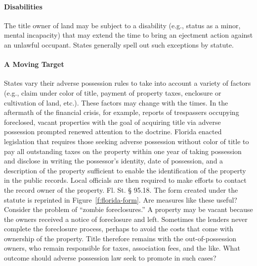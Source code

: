 \paragraph{Disabilities} The title owner of land may be subject to a
disability (e.g., status as a minor, mental incapacity) that may extend the
time to bring an ejectment action against an unlawful occupant. States
generally spell out such exceptions by statute.


\paragraph{A Moving Target} States vary their adverse possession rules to
take into account a variety of factors (e.g., claim under color of title,
payment of property taxes, enclosure or cultivation of land, etc.). These
factors may change with the times. In the aftermath of the financial crisis,
for example, reports of trespassers occupying foreclosed, vacant properties
with the goal of acquiring title via adverse possession prompted renewed
attention to the doctrine. Florida enacted legislation that requires those
seeking adverse possession without color of title to pay all outstanding taxes
on the property within one year of taking possession and disclose in writing
the possessor's identity, date of possession, and a description of the property
sufficient to enable the identification of the property in the public records.
Local officials are then required to make efforts to contact the record owner
of the property. Fl. St. {\S} 95.18. The form created under the statute is
reprinted in Figure~\ref{f:florida-form}.
Are measures like these useful? Consider the problem of
``zombie foreclosures.'' A property may be vacant because the owners received a
notice of foreclosure and left. Sometimes the lenders never complete the
foreclosure process, perhaps to avoid the costs that come with ownership of the
property. Title therefore remains with the out-of-possession owners, who remain
responsible for taxes, association fees, and the like. What outcome should
adverse possession law seek to promote in such cases?


